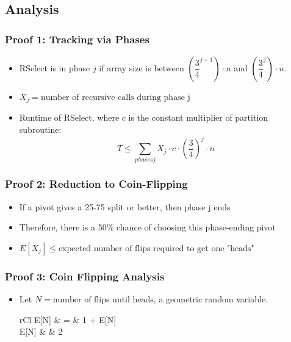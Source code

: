 \documentclass[11pt]{article}
\begin{document}
	\subsection{Analysis}
		\subsubsection{Proof 1: Tracking via Phases}
			\begin{itemize}
				\item RSelect is in phase $j$ if array size is between $\left(\dfrac{3}{4}^{j+1}\right)\cdot n$ and $\left(\dfrac{3}{4}^j\right)\cdot n$.
				\item $X_j = \text{number of recursive calls during phase j}$
				\item Runtime of RSelect, where $c$ is the constant multiplier of partition subroutine:
					\begin{equation}
						T\leq \sum_{phases j} X_j\cdot c \cdot\left(\frac{3}{4}\right)^j\cdot n
					\end{equation}
			\end{itemize}
			
		\subsubsection{Proof 2: Reduction to Coin-Flipping}
			\begin{itemize}
				\item If a pivot gives a 25-75 split or better, then phase j ends
				\item Therefore, there is a 50\% chance of choosing this phase-ending pivot
				\item $E[X_j]\leq\text{expected number of flips required to get one "heads"}$
			\end{itemize}
			
		\subsubsection{Proof 3: Coin Flipping Analysis}
			\begin{itemize}
				\item Let $N = \text{number of flips until heads}$, a geometric random variable.
				\begin{IEEEeqnarray}{rCl}
					E[N] & = & 1 + E[N]\\
					E[N] & \leq & 2
				\end{IEEEeqnarray}
			\end{itemize}
			
\end{document}
